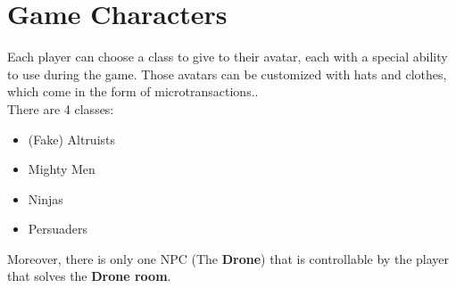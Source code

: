 \section{Game Characters}

Each player can choose a class to give to their avatar, each with a special ability to use during the game. Those avatars can be customized with hats and clothes, which come in the form of microtransactions..\\
There are 4 classes:\\
\begin{itemize}
	\item (Fake) Altruists
	\item Mighty Men
	\item Ninjas
	\item Persuaders
\end{itemize}
Moreover, there is only one NPC (The \textbf{Drone}) that is controllable by the player that solves the \textbf{Drone room}.


\clearpage




\clearpage





\pagebreak 